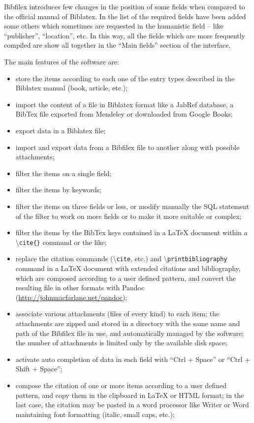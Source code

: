 \documentclass[a4paper,12pt]{report}
\begin{document}
Bibfilex introduces few changes in the position of some fields when compared to the official manual of Biblatex. In the list of the required fields have been added some others which sometimes are requested in the humanistic field -- like “publisher”, “location”, etc. In this way, all the fields which are more frequently compiled are show all together in the “Main fields” section of the interface.

The main features of the software are:
\begin{itemize}
\item store the items according to each one of the entry types described in the Biblatex manual (book, article, etc.);
\item import the content of a file in Biblatex format like a JabRef database, a BibTex file exported from Mendeley or downloaded from Google Books;
\item export data in a Biblatex file;
\item import and export data from a Bibfilex file to another along with possible attachments;
\item filter the items on a single field;
\item filter the items by keywords;
\item filter the items on three fields or less, or modify manually the SQL statement of the filter to work on more fields or to make it more suitable or complex;
\item filter the items by the BibTex keys contained in a LaTeX document within a \textbackslash \texttt{cite\{\}} command or the like;
\item replace the citation commands (\textbackslash \texttt{cite}, etc.) and \textbackslash \texttt{printbibliography} command in a LaTeX document with extended citations and bibliography, which are composed according to a user defined pattern, and convert the resulting file in other formats with Pandoc (\url{http://johnmacfarlane.net/pandoc});
\item associate various attachments (files of every kind) to each item; the attachments are zipped and stored in a directory with the same name and path of the Bibfilex file in use, and automatically managed by the software; the number of attachments is limited only by the available disk space;
\item activate auto completion of data in each field with “Ctrl + Space” or “Ctrl + Shift + Space”;
\item compose the citation of one or more items according to a user defined pattern, and copy them in the clipboard in LaTeX or HTML format; in the last case, the citation may be pasted in a word processor like Writer or Word maintaining font formatting (italic, small caps, etc.);

\end{itemize}
\end{document}
